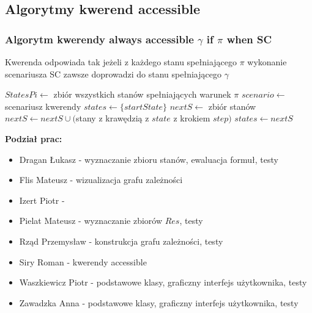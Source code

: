 \documentclass{article}
\begin{document}
\subsection{Algorytmy kwerend accessible}
\subsubsection{Algorytm kwerendy always accessible $\gamma$ if $\pi$ when SC }

Kwerenda odpowiada tak jeżeli z każdego stanu spełniającego $\pi$ wykonanie scenariusza SC zawsze doprowadzi do stanu spełniającego $\gamma$

\begin{algorithm}[H]
\begin{algorithmic}
\State $StatesPi \gets $ zbiór wszystkich stanów spełniających warunek $\pi$ 
\State $scenario \gets $ scenariusz kwerendy
    \State $states \gets \{startState\}$
	    \State $nextS \gets $ zbiór stanów
			\State $nextS \gets nextS \cup ($stany z krawędzią z $state$ z krokiem $step)$
		\EndFor 
		\State $states \gets nextS$
	\EndFor
	    \State {}
	\EndIf
\EndFor
\State {}
\end{algorithmic}
\end{algorithm}



\newpage
\textbf{Podział prac:}
\begin{itemize}
    \item Dragan Łukasz - wyznaczanie zbioru stanów, ewaluacja formuł, testy
    \item Flis Mateusz - wizualizacja grafu zależności
    \item Izert Piotr - 
    \item Pielat Mateusz - wyznaczanie zbiorów $Res$, testy
    \item Rząd Przemysław - konstrukcja grafu zależności, testy
    \item Siry Roman - kwerendy accessible
    \item Waszkiewicz Piotr - podstawowe klasy, graficzny interfejs użytkownika, testy
    \item Zawadzka Anna - podstawowe klasy, graficzny interfejs użytkownika, testy
\end{itemize}
\end{document}
